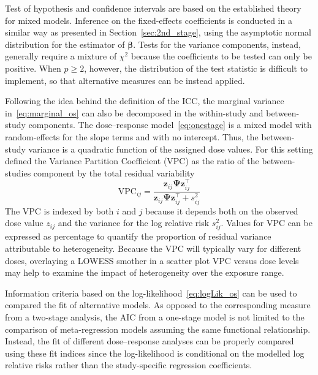 \documentclass[11pt,a4paper,twoside,openany]{book}\usepackage{knitr}
\begin{document}
{{Test of hypothesis and confidence intervals are based on the established theory for mixed models. Inference on the fixed-effects coefficients is conducted in a similar way as presented in Section~\ref{sec:2nd_stage}, using the asymptotic normal distribution for the estimator of $\boldsymbol{\beta}$. Tests for the variance components, instead, generally require a mixture of $\chi^2$ because the coefficients to be tested can only be positive. When $p \ge 2$, however, the distribution of the test statistic is difficult to implement, so that alternative measures can be instead applied. 

\noindent Following the idea behind the definition of the ICC, the marginal variance in~\ref{eq:marginal_os} can also be decomposed in the within-study and between-study components. The dose--response model~\ref{eq:onestage} is a mixed model with random-effects for the slope terms and with no intercept. Thus, the between-study variance is a quadratic function of the assigned dose values. For this setting \cite{goldstein2002partitioning} defined the Variance Partition Coefficient (VPC) as the ratio of the between-studies component by the total residual variability
\begin{equation}
\textrm{VPC}_{ij} = \frac{\mathbf{z}_{ij} \boldsymbol{\Psi} \mathbf{z}_{ij}^\top}{\mathbf{z}_{ij} \boldsymbol{\Psi} \mathbf{z}_{ij}^\top  + s_{ij}^2}
\label{eq:vpc}
\end{equation}
\noindent The VPC is indexed by both $i$ and $j$ because it depends both on the observed dose value $z_{ij}$ and the variance for the log relative risk $s_{ij}^2$. Values for VPC can be expressed as percentage to quantify the proportion of residual variance attributable to heterogeneity. Because the VPC will typically vary for different doses, overlaying a LOWESS smother in a scatter plot VPC versus dose levels may help to examine the impact of heterogeneity over the exposure range.

Information criteria based on the log-likelihood~\ref{eq:logLik_os} can be used to compared the fit of alternative models. As opposed to the corresponding measure from a two-stage analysis, the AIC from a one-stage model is not limited to the comparison of meta-regression models assuming the same functional relationship. Instead, the fit of different dose--response analyses can be properly compared using these fit indices since the log-likelihood is conditional on the modelled log relative risks rather than the study-specific regression coefficients. 



}}
\end{document}
